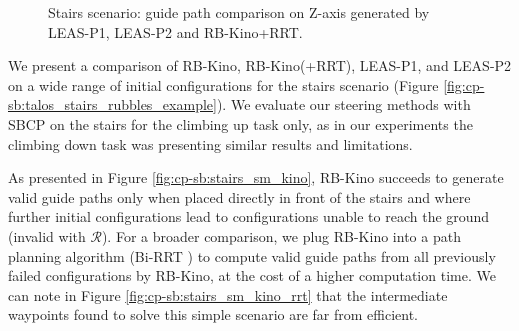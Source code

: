 \begin{figure}[h]
    \centering
    \caption{Stairs scenario: guide path comparison on Z-axis generated by LEAS-P1, LEAS-P2 and RB-Kino+RRT.}
    \label{fig:cp-sb:stairs_xz}
\end{figure}
We present a comparison of RB-Kino, RB-Kino(+RRT), LEAS-P1, and LEAS-P2 on a wide range of initial configurations for the stairs scenario (Figure \ref{fig:cp-sb:talos_stairs_rubbles_example}).
We evaluate our steering methods with SBCP on the stairs for the climbing up task only, as in our experiments the climbing down task was presenting similar results and limitations.

As presented in Figure \ref{fig:cp-sb:stairs_sm_kino}, RB-Kino succeeds to generate valid guide paths only when placed directly in front of the stairs and where further initial configurations lead to configurations unable to reach the ground (invalid with $\mathcal{R}$). 
For a broader comparison, we plug RB-Kino into a path planning algorithm (Bi-RRT \cite{Bi-RRT}) to compute valid guide paths from all previously failed configurations by RB-Kino, at the cost of a higher computation time.
We can note in Figure \ref{fig:cp-sb:stairs_sm_kino_rrt} that the intermediate waypoints found to solve this simple scenario are far from efficient.

